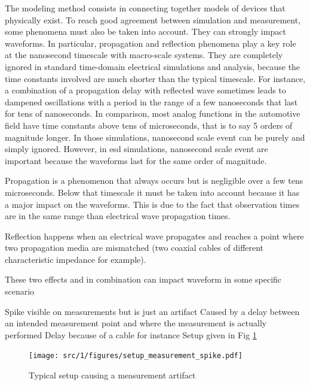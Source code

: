 The modeling method consists in connecting together models of devices that physically exist.
To reach good agreement between simulation and measurement, some phenomena must also be taken into account.
They can strongly impact waveforms.
In particular, propagation and reflection phenomena play a key role at the nanosecond timescale with macro-scale systems.
They are completely ignored in standard time-domain electrical simulations and analysis, because the time constants involved are much shorter than the typical timescale.
For instance, a combination of a propagation delay with reflected wave sometimes leads to dampened oscillations with a period in the range of a few nanoseconds that last for tens of nanoseconds.
In comparison, most analog functions in the automotive field have time constants above tens of microseconds, that is to say 5 orders of magnitude longer.
In those simulations, nanosecond scale event can be purely and simply ignored.
However, in \gls{esd} simulations, nanosecond scale event are important because the waveforms last for the same order of magnitude.

Propagation is a phenomenon that always occurs but is negligible over a few tens microseconds.
Below that timescale it must be taken into account because it has a major impact on the waveforms.
This is due to the fact that observation times are in the same range than electrical wave propagation times.

Reflection happens when an electrical wave propagates and reaches a point where two propagation media are mismatched (two coaxial cables of different characteristic impedance for example).

These two effects and in combination can impact waveform in some specific scenario

Spike visible on measurements but is just an artifact
Caused by a delay between an intended measurement point and where the measurement is actually performed
Delay because of a cable for instance
Setup given in Fig \ref{fig:setup-measurement-spike}

\begin{figure}[!h]
  \centering
  \texttt{[image: src/1/figures/setup\_measurement\_spike.pdf]}
  \caption{Typical setup causing a measurement artifact}
  \label{fig:setup-measurement-spike}
\end{figure}

